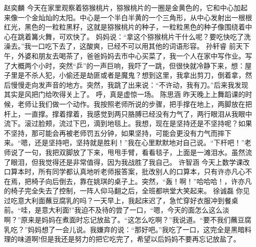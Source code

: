 {}\markdownRendererInterblockSeparator
{}赵奕麟\markdownRendererInterblockSeparator
{}今天在家里观察着猕猴桃片，猕猴桃片的一圈是金黄色的，它和中心加起来像一个金灿灿的太阳。中心是一个半白半黄的一个三角形，从中心发射出一根根红光，黑色的一粒粒黑籽，这就是猕猴桃片的种子，一粒粒黑色的种子像围绕着中心在跳着篝火舞，可欢快了。\markdownRendererInterblockSeparator
{}妈妈说：“拿这个猕猴桃片干什么呢？要吃快吃了洗澡去。”我一口吃下去了，这酸爽，已经不可以用其他的词语形容。\markdownRendererInterblockSeparator
{}\markdownRendererInterblockSeparator
{}孙轩睿\markdownRendererInterblockSeparator
{}前天下午，外婆和朋友去喝茶了，爸爸妈妈去市中心买菜了，我一个人在家中写作业。写了大概两个小时，突然“乒”的一声巨响，我吓了一跳，但很快就冷静下来，想：屋子里是不杀人犯，小偷还是劫匪或者是魔鬼？想到这里，我拿出剪刀，倒着拿，然后慢慢走向发声音的地方。突然，我跳了出来说：“不许动，我有刀。”后来我发现其实是风把门给吹得关上了。 呼，真是虚惊一场。\markdownRendererInterblockSeparator
{}\markdownRendererInterblockSeparator
{}陈思涵\markdownRendererInterblockSeparator
{}昨天晚上上舞蹈课的时候，老师让我们做一个动作。我按照老师所说的步骤，把手撑在地上，两脚放在把杆上，一直撑。撑着撑着，我感觉到两只胳膊已经没有力气了，两行眼泪从我眼中流下。滚过脸颊，流过下巴，滴到地毯上。我想，现在是坚持还是不坚持呢？如果不坚持，那可能会再被老师罚五分钟，如果坚持，可能会更没有力气而摔下来。“嗯，还是坚持吧，坚持就是胜利！”我在心里默默地对自己说。“下杆吧！”老师说了一句，我把双脚放了下来，甩甩手臂，看看毯子，上面是一滩泪水。虽然流了眼泪，但我觉得还是非常值得，因为我战胜了我自己。\markdownRendererInterblockSeparator
{}\markdownRendererInterblockSeparator
{}许智涵\markdownRendererInterblockSeparator
{}今天上数学课改口算本时，所有同学都认真地听老师报答案，批改别人的口算本，只有许亦凡心不在焉，把椅子向后倒去，靠在姚琪的桌子上。突然，“轰！啊！”哈哈哈！，许亦凡的椅子完全失去了控制，一阵人仰马翻之后，全班都哄堂大笑起来。\markdownRendererInterblockSeparator
{}\markdownRendererInterblockSeparator
{}徐诚磊\markdownRendererInterblockSeparator
{}你见过吃意大利面蘸豆腐乳的吗？一天早上，我起床迟了，急忙穿好衣服冲到餐桌前。“哇，是意大利面!”我迫不及待的尝了一口，“嗯，今天的面怎么这么淡啊？”原来是妈妈在煮面时忘记放盐了。“这怎么吃啊？”我说道。“要不我们蘸豆腐乳吃？”妈妈想了一会儿说。我嫌弃的说：“那好吧。”我吃了一口，这完全是黑暗料理的味道啊!但是我还是努力的把它吃完了，希望以后妈妈不要再忘记放盐了。\markdownRendererInterblockSeparator
